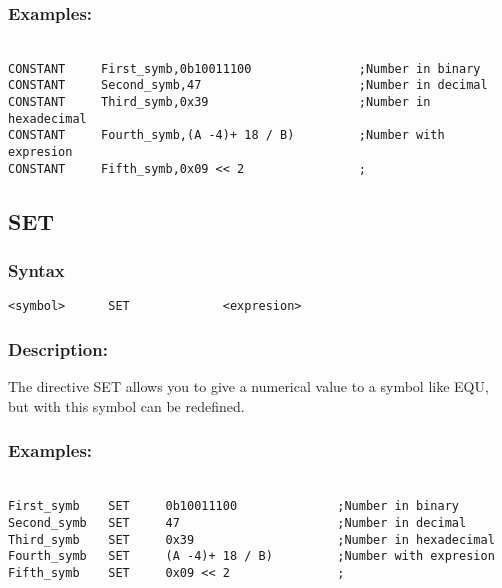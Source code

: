         \subsubsection{Examples:}
        {
            ~\\
            \usecodefont
            \verb'CONSTANT     First_symb,0b10011100               ;Number in binary'\\
            \verb'CONSTANT     Second_symb,47                      ;Number in decimal'\\
            \verb'CONSTANT     Third_symb,0x39                     ;Number in hexadecimal'\\
            \verb'CONSTANT     Fourth_symb,(A -4)+ 18 / B)         ;Number with expresion'\\
            \verb'CONSTANT     Fifth_symb,0x09 << 2                ;'\\
        }

    \subsection{SET}
        \subsubsection{Syntax}
            \verb'<symbol>      SET             <expresion>'

        \subsubsection{Description:}
            The directive SET allows you to give a numerical value to a symbol like EQU, but with this symbol can be redefined.

        \subsubsection{Examples:}
        {
            ~\\
            \usecodefont
            \verb'First_symb    SET     0b10011100              ;Number in binary'\\
            \verb'Second_symb   SET     47                      ;Number in decimal'\\
            \verb'Third_symb    SET     0x39                    ;Number in hexadecimal'\\
            \verb'Fourth_symb   SET     (A -4)+ 18 / B)         ;Number with expresion'\\
            \verb'Fifth_symb    SET     0x09 << 2               ;'\\
        }
        
